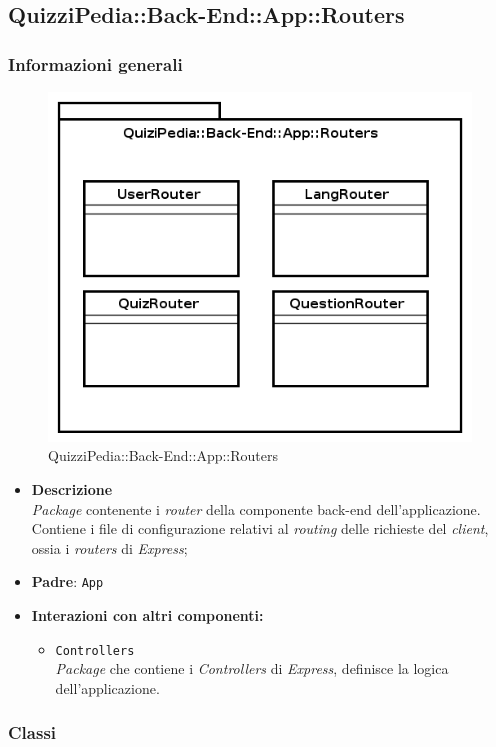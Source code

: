 \subsection{QuizziPedia::Back-End::App::Routers}
\subsubsection{Informazioni generali}
\label{QuizziPedia::Back-End::App::Routers}
\begin{figure}[ht]
	\centering
	\includegraphics[scale=0.45]{UML/Package/QuizziPedia_Back-End_App_Routers.png}
	\caption{QuizziPedia::Back-End::App::Routers}
\end{figure}
\FloatBarrier
	\begin{itemize}
		\item \textbf{Descrizione} \\
		\textit{Package} contenente i \textit{router} della componente back-end dell'applicazione. Contiene i file di configurazione relativi al \textit{routing} delle richieste del \textit{client}, ossia i \textit{routers} di \textit{Express};
		\item \textbf{Padre}: \texttt{App}
		\item \textbf{Interazioni con altri componenti:}
			\begin{itemize}
				\item \texttt{Controllers} \\
				\textit{Package} che contiene i \textit{Controllers} di \textit{Express}, definisce la logica dell'applicazione.
			\end{itemize}
	\end{itemize}
\subsubsection{Classi}





